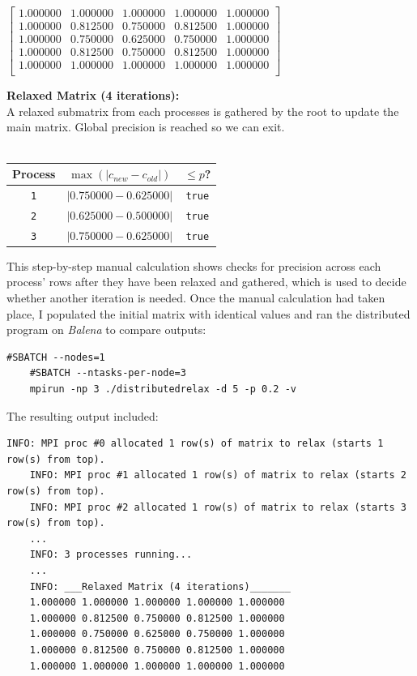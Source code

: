 \documentclass[11pt]{article}
\begin{document}
\hspace{-0.4cm}\begin{minipage}{0.47\textwidth}
$
\begin{bmatrix}
1.000000 & 1.000000 & 1.000000 & 1.000000 & 1.000000 \\
1.000000 & 0.812500 & 0.750000 & 0.812500 & 1.000000 \\
1.000000 & 0.750000 & 0.625000 & 0.750000 & 1.000000 \\
1.000000 & 0.812500 & 0.750000 & 0.812500 & 1.000000 \\
1.000000 & 1.000000 & 1.000000 & 1.000000 & 1.000000 \\
\end{bmatrix}
$
\end{minipage}\hspace{1.8cm}{\color{cyan!90}\vline}\hspace{0.5cm}
\begin{minipage}{.47\textwidth}\textbf{Relaxed Matrix (4 iterations):}\\
A relaxed submatrix from each processes is gathered by the root to update the main matrix. Global precision is reached so we can exit.
\\
\\
\begin{tabular}{|c|c|c|}
\hline
\textbf{Process} & \textbf{$\max(|c_{new}-c_{old}|)$} & \textbf{$\leq p$?} \\
\hline
\texttt{1} & $|0.750000-0.625000|$ & {\color{blue}\texttt{true}}\\
\texttt{2} & $|0.625000-0.500000|$ & {\color{blue}\texttt{true}}\\
\texttt{3} & $|0.750000-0.625000|$ & {\color{blue}\texttt{true}}\\
\hline
\end{tabular}
\end{minipage}

This step-by-step manual calculation shows checks for precision across each process' rows after they have been relaxed and gathered, which is used to decide whether another iteration is needed.  Once the manual calculation had taken place, I populated the initial matrix with identical values and ran the distributed program on \textsl{Balena} to compare outputs:
\begin{lstlisting}[style=BashInputStyle]
	#SBATCH --nodes=1
	#SBATCH --ntasks-per-node=3
    mpirun -np 3 ./distributedrelax -d 5 -p 0.2 -v
\end{lstlisting}
The resulting output included:
\begin{lstlisting}[style=BashInputStyle]
	INFO: MPI proc #0 allocated 1 row(s) of matrix to relax (starts 1 row(s) from top).
	INFO: MPI proc #1 allocated 1 row(s) of matrix to relax (starts 2 row(s) from top).
	INFO: MPI proc #2 allocated 1 row(s) of matrix to relax (starts 3 row(s) from top).
	...
	INFO: 3 processes running...
	...
	INFO: ___Relaxed Matrix (4 iterations)_______
	1.000000 1.000000 1.000000 1.000000 1.000000
	1.000000 0.812500 0.750000 0.812500 1.000000
	1.000000 0.750000 0.625000 0.750000 1.000000
	1.000000 0.812500 0.750000 0.812500 1.000000
	1.000000 1.000000 1.000000 1.000000 1.000000
\end{lstlisting}
\end{document}
